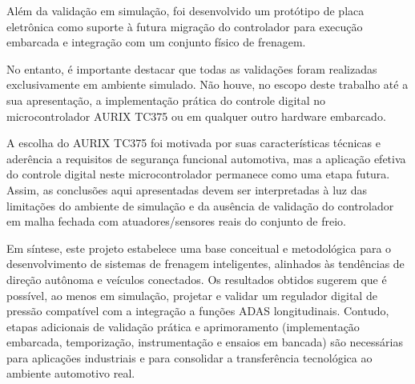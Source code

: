 Além da validação em simulação, foi desenvolvido um protótipo de placa eletrônica como suporte à futura migração do controlador para execução embarcada e integração com um conjunto físico de frenagem.

No entanto, é importante destacar que todas as validações foram realizadas exclusivamente em ambiente simulado. Não houve, no escopo deste trabalho até a sua apresentação, a implementação prática do controle digital no microcontrolador AURIX TC375 ou em qualquer outro hardware embarcado.

A escolha do AURIX TC375 foi motivada por suas características técnicas e aderência a requisitos de segurança funcional automotiva, mas a aplicação efetiva do controle digital neste microcontrolador permanece como uma etapa futura. Assim, as conclusões aqui apresentadas devem ser interpretadas à luz das limitações do ambiente de simulação e da ausência de validação do controlador em malha fechada com atuadores/sensores reais do conjunto de freio.

Em síntese, este projeto estabelece uma base conceitual e metodológica para o desenvolvimento de sistemas de frenagem inteligentes, alinhados às tendências de direção autônoma e veículos conectados. Os resultados obtidos sugerem que é possível, ao menos em simulação, projetar e validar um regulador digital de pressão compatível com a integração a funções ADAS longitudinais. Contudo, etapas adicionais de validação prática e aprimoramento (implementação embarcada, temporização, instrumentação e ensaios em bancada) são necessárias para aplicações industriais e para consolidar a transferência tecnológica ao ambiente automotivo real.


